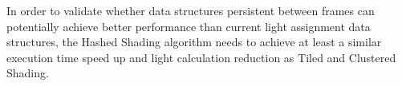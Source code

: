 In order to validate whether data structures persistent between frames can
potentially achieve better performance than current light assignment data
structures, the Hashed Shading algorithm needs to achieve at least a similar
execution time speed up and light calculation reduction as Tiled and Clustered
Shading.







